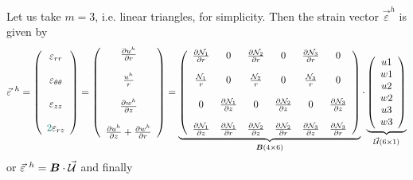 \noindent Let us take $m=3$, i.e. linear triangles, for simplicity. Then 
the strain vector $\vec{\varepsilon}^h$ is given by
\[
\vec\varepsilon^{~h}=
\left(
\begin{array}{c}
\varepsilon_{rr} \\ \\
\varepsilon_{\theta\theta} \\ \\
\varepsilon_{zz} \\ \\
{\color{teal}2}\varepsilon_{rz}
\end{array}
\right)
=
\left(
\begin{array}{c}
\frac{\partial u^h}{\partial r} \\ \\
\frac{u^h}{r} \\ \\
\frac{\partial w^h}{\partial z} \\ \\
\frac{\partial u^h}{\partial z} + \frac{\partial w^h}{\partial r} 
\end{array}
\right)
=
\underbrace{
\left(
\begin{array}{ccccccccc}
\frac{\partial {\mathcal{N}}_1}{\partial r} &  0 &  
\frac{\partial {\mathcal{N}}_2}{\partial r} &  0 &
\frac{\partial {\mathcal{N}}_3}{\partial r} &  0 \\  \\
\frac{{\mathcal{N}}_1}{r}  & 0 &  
\frac{{\mathcal{N}}_2}{r}  & 0 &
\frac{{\mathcal{N}}_3}{r}  & 0 \\  \\
 0 & \frac{\partial {\mathcal{N}}_1}{\partial z}  &
 0 & \frac{\partial {\mathcal{N}}_2}{\partial z}  &
 0 & \frac{\partial {\mathcal{N}}_3}{\partial z}  \\ \\
\frac{\partial {\mathcal{N}}_1}{\partial z} & \frac{\partial {\mathcal{N}}_1}{\partial r}  &
\frac{\partial {\mathcal{N}}_2}{\partial z} & \frac{\partial {\mathcal{N}}_2}{\partial r}  &
\frac{\partial {\mathcal{N}}_3}{\partial z} & \frac{\partial {\mathcal{N}}_3}{\partial r}   
\end{array}
\right)
}_{\bm B (4\times 6) }
\cdot
\underbrace{
\left(
\begin{array}{c}
u1 \\  w1 \\ u2 \\  w2 \\ u3 \\ w3 
\end{array}
\right)
}_{\vec {\cal U} (6\times1)}
\]
or $\vec{\varepsilon}^{~h}= {\bm B} \cdot \vec{\cal U}$
and finally 
